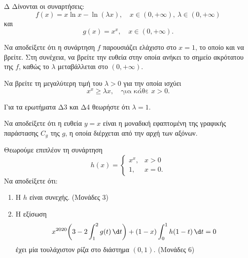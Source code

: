 \begin{thema}{Δ}
Δίνονται οι συναρτήσεις:
\[
f(x) = x\ln x - \ln(\lambda x), \quad x \in (0,+\infty),\ \lambda \in (0,+\infty)
\]
και
\[
g(x) = x^x, \quad x \in (0,+\infty).
\]
\begin{erwthma}
    \item Να αποδείξετε ότι η συνάρτηση $f$ παρουσιάζει ελάχιστο στο $x = 1$, το οποίο και να βρείτε. Στη συνέχεια, να βρείτε την ευθεία στην οποία ανήκει το σημείο ακρότατου της $f$, καθώς το $\lambda$ μεταβάλλεται στο $(0,+\infty)$. 

    \item Να βρείτε τη μεγαλύτερη τιμή του $\lambda > 0$ για την οποία ισχύει
    \[
    x^x \geq \lambda x, \quad \text{για κάθε } x > 0.
    \]

    {Για τα ερωτήματα Δ3 και Δ4 θεωρήστε ότι $\lambda = 1$.}

    \item Να αποδείξετε ότι η ευθεία $y = x$ είναι η μοναδική εφαπτομένη της γραφικής παράστασης $C_g$ της $g$, η οποία διέρχεται από την αρχή των αξόνων. 

    \item Θεωρούμε επιπλέον τη συνάρτηση
    \[
    h(x) = \begin{cases} x^x, & x > 0 \\ 1, & x = 0. \end{cases}
    \]
    Να αποδείξετε ότι:
    \begin{enumerate}[label=\roman*.]
        \item Η $h$ είναι συνεχής. \hfill(Μονάδες 3)
        \item Η εξίσωση
        \[
        x^{2020}\!\left(3 - 2\int_1^2 g(t)\,\d t\right) + (1-x)\int_0^1 h(1-t)\,\d t = 0
        \]
        έχει μία τουλάχιστον ρίζα στο διάστημα $(0,1)$. \hfill(Μονάδες 6)
    \end{enumerate}
\end{erwthma}
\end{thema}

